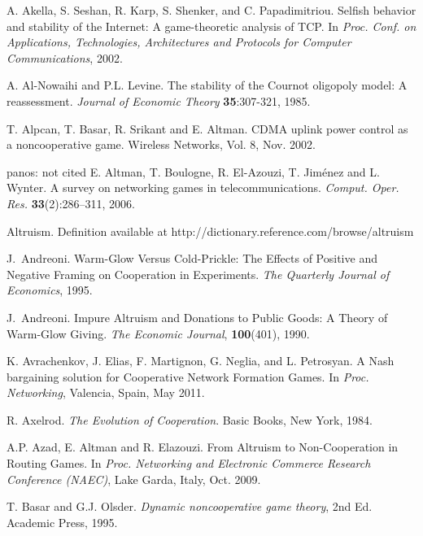 \documentclass[12pt,onecolumn,draftcls]{IEEEtran}
\begin{document}

\begin{thebibliography}{9}

A. Akella, S. Seshan, R. Karp, S. Shenker, and C. Papadimitriou.
Selfish behavior and stability of
the Internet: A game-theoretic analysis of TCP.
In {\em Proc. Conf. on Applications, Technologies,
Architectures and Protocols for Computer Communications},
2002.

A. Al-Nowaihi and P.L. Levine.
The stability of the Cournot oligopoly model: A reassessment.
{\em Journal of Economic Theory}  {\bf 35}:307-321, 1985.

T. Alpcan, T. Basar, R. Srikant and E. Altman. 
CDMA uplink power control as a noncooperative game.
Wireless Networks, Vol. 8, Nov. 2002.




panos: not cited
 E. Altman, T. Boulogne,  R. El-Azouzi, T. Jim\'{e}nez and L. Wynter.
 A survey on networking games in telecommunications.
 {\em Comput. Oper. Res.}
 {\bf 33}(2):286--311, 2006.

Altruism. Definition available at
http://dictionary.reference.com/browse/altruism

J.~Andreoni.
Warm-Glow Versus Cold-Prickle: The Effects of Positive and Negative Framing on Cooperation in Experiments.
{\em The Quarterly Journal of Economics},
1995.

J.~Andreoni.
Impure Altruism and Donations to Public Goods: A Theory of Warm-Glow Giving.
{\em The Economic Journal}, {\bf 100}(401), 1990.





K. Avrachenkov, J. Elias, F. Martignon, G. Neglia, and L. Petrosyan. 
A Nash bargaining solution for Cooperative Network Formation Games. 
In {\em Proc. Networking}, Valencia, Spain, May 2011.


R. Axelrod. 
{\em The Evolution of Cooperation}.
Basic Books, New York,
1984.


A.P. Azad, E. Altman and R. Elazouzi.
From Altruism to Non-Cooperation in Routing Games. 
In {\em Proc. Networking and Electronic Commerce Research Conference (NAEC)},
Lake Garda, Italy, Oct.  2009.

T. Basar and G.J. Olsder.
{\em Dynamic noncooperative game theory}, 2nd Ed.
Academic Press, 1995.




\end{thebibliography}
\end{document}

